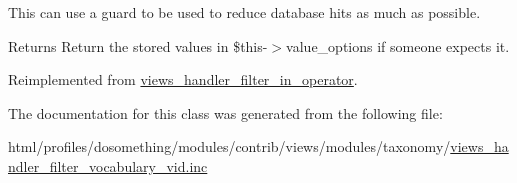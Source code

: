This can use a guard to be used to reduce database hits as much as possible.

\begin{DoxyReturn}{Returns}
Return the stored values in \$this-\/$>$value\_\-options if someone expects it. 
\end{DoxyReturn}


Reimplemented from \hyperlink{classviews__handler__filter__in__operator_aa5b5df6d90f4359ed28c0c446bdc81a6}{views\_\-handler\_\-filter\_\-in\_\-operator}.

The documentation for this class was generated from the following file:\begin{DoxyCompactItemize}
\item 
html/profiles/dosomething/modules/contrib/views/modules/taxonomy/\hyperlink{views__handler__filter__vocabulary__vid_8inc}{views\_\-handler\_\-filter\_\-vocabulary\_\-vid.inc}\end{DoxyCompactItemize}
